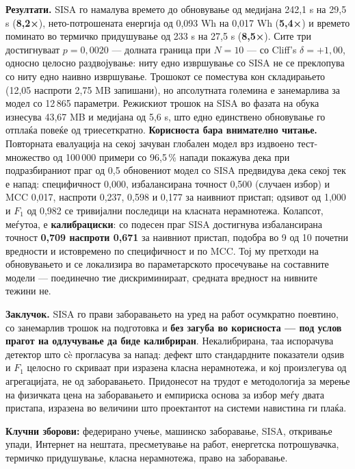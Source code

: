 \textbf{Резултати.} SISA го намалува времето до обновување од медијана 242,1 s на 29,5 s
(\textbf{8,2×}), нето-потрошената енергија од 0,093 Wh на 0,017 Wh (\textbf{5,4×}) и времето поминато
во термичко придушување од 233 s на 27,5 s (\textbf{8,5×}). Сите три достигнуваат
$p = 0{,}0020$ --- долната граница при $N = 10$ --- со Cliff's $\delta = +1{,}00$, односно
целосно раздвојување: ниту едно извршување со SISA не се преклопува со ниту едно наивно
извршување. Трошокот се поместува кон складирањето (12,05 наспроти 2,75 MB запишани), но
апсолутната големина е занемарлива за модел со 12\,865 параметри. Режискиот трошок на SISA во
фазата на обука изнесува 43,67 MB и медијана од 5,6 s, што едно единствено обновување го
отплаќа повеќе од триесеткратно. \textbf{Корисноста бара внимателно читање.} Повторната евалуација
на секој зачуван глобален модел врз издвоено тест-множество од 100\,000 примери со 96,5\,\%
напади покажува дека при подразбираниот праг од 0,5 обновениот модел со SISA предвидува дека
секој тек е напад: специфичност 0,000, избалансирана точност 0,500 (случаен избор) и MCC
0,017, наспроти 0,237, 0,598 и 0,177 за наивниот пристап; одѕивот од 1,000 и $F_1$ од 0,982
се тривијални последици на класната нерамнотежа. Колапсот, меѓутоа, е \textbf{калибрациски}: со
подесен праг SISA достигнува избалансирана точност \textbf{0,709 наспроти 0,671} за наивниот
пристап, подобра во 9 од 10 почетни вредности и истовремено по специфичност и по MCC. Тој
му претходи на обновувањето и се локализира во параметарското просечување на составните
модели --- поединечно тие дискриминираат, средната вредност на нивните тежини не.

\textbf{Заклучок.} SISA го прави заборавањето на уред на работ осумкратно поевтино, со занемарлив
трошок на подготовка и \textbf{без загуба во корисноста --- под услов прагот на одлучување да биде
калибриран}. Некалибрирана, таа испорачува детектор што сè прогласува за напад: дефект што
стандардните показатели одѕив и $F_1$ целосно го скриваат при изразена класна нерамнотежа, и
кој произлегува од агрегацијата, не од заборавањето. Придонесот на трудот е методологија за
мерење на физичката цена на заборавањето и емпириска основа за избор меѓу двата пристапа,
изразена во величини што проектантот на системи навистина ги плаќа.

\textbf{Клучни зборови:} федерирано учење, машинско заборавање, SISA, откривање упади, Интернет
на нештата, пресметување на работ, енергетска потрошувачка, термичко придушување, класна
нерамнотежа, право на заборавање.

